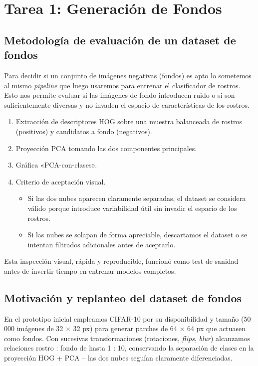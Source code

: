 \documentclass{article}
\begin{document}
\newpage

\section*{Tarea 1: Generación de Fondos}

\subsection*{Metodología de evaluación de un dataset de fondos}

Para decidir si un conjunto de imágenes negativas (fondos) es apto lo sometemos al mismo \textit{pipeline} que luego usaremos para entrenar el clasificador de rostros. Esto nos permite evaluar si las imágenes de fondo introducen ruido o si son suficientemente diversas y no invaden el espacio de características de los rostros.

\begin{enumerate}
    \item Extracción de descriptores HOG sobre una muestra balanceada de rostros (positivos) y candidatos a fondo (negativos).
    \item Proyección PCA tomando las dos componentes principales.
    \item Gráfica «PCA-con-clases».
    \item Criterio de aceptación visual.  
       \begin{itemize}
            \item Si las dos nubes aparecen claramente separadas, el dataset se considera válido porque introduce variabilidad útil sin invadir el espacio de los rostros.
            \item Si las nubes se solapan de forma apreciable, descartamos el dataset o se intentan filtrados adicionales antes de aceptarlo.
       \end{itemize}
\end{enumerate}

Esta inspección visual, rápida y reproducible, funcionó como test de sanidad antes de invertir tiempo en entrenar modelos completos.

\subsection*{Motivación y replanteo del dataset de fondos}

En el prototipo inicial empleamos CIFAR-10 por su disponibilidad y tamaño (50 000 imágenes de 32 × 32 px) para generar parches de 64 × 64 px que actuasen como fondos. Con sucesivas transformaciones (rotaciones, \textit{flips}, \textit{blur}) alcanzamos relaciones rostro : fondo de hasta 1 : 10, conservando la separación de clases en la proyección HOG + PCA – las dos nubes seguían claramente diferenciadas.
\end{document}
